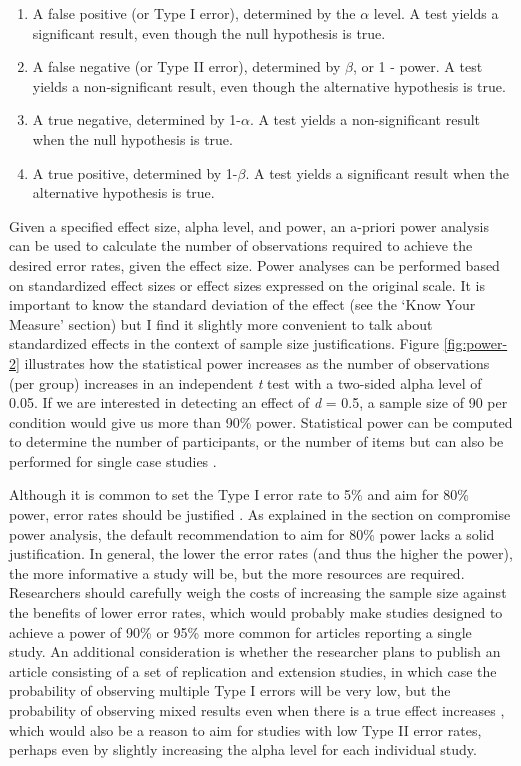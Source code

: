\documentclass[
  oneside]{krantz}
\providecommand{\tightlist}{%
  \setlength{\itemsep}{0pt}\setlength{\parskip}{0pt}}
\begin{document}
\begin{enumerate}
\def\labelenumi{\arabic{enumi}.}
\tightlist
\item
  A false positive (or Type I error), determined by the \(\alpha\) level. A test yields a significant result, even though the null hypothesis is true.
\item
  A false negative (or Type II error), determined by \(\beta\), or 1 - power. A test yields a non-significant result, even though the alternative hypothesis is true.
\item
  A true negative, determined by 1-\(\alpha\). A test yields a non-significant result when the null hypothesis is true.
\item
  A true positive, determined by 1-\(\beta\). A test yields a significant result when the alternative hypothesis is true.
\end{enumerate}

Given a specified effect size, alpha level, and power, an a-priori power analysis can be used to calculate the number of observations required to achieve the desired error rates, given the effect size. Power analyses can be performed based on standardized effect sizes or effect sizes expressed on the original scale. It is important to know the standard deviation of the effect (see the `Know Your Measure' section) but I find it slightly more convenient to talk about standardized effects in the context of sample size justifications. Figure \ref{fig:power-2} illustrates how the statistical power increases as the number of observations (per group) increases in an independent \emph{t} test with a two-sided alpha level of 0.05. If we are interested in detecting an effect of \emph{d} = 0.5, a sample size of 90 per condition would give us more than 90\% power. Statistical power can be computed to determine the number of participants, or the number of items \citep{westfall_statistical_2014} but can also be performed for single case studies \citep{ferron_power_1996, mcintosh_power_2020}.

Although it is common to set the Type I error rate to 5\% and aim for 80\% power, error rates should be justified \citep{lakens_justify_2018}. As explained in the section on compromise power analysis, the default recommendation to aim for 80\% power lacks a solid justification. In general, the lower the error rates (and thus the higher the power), the more informative a study will be, but the more resources are required. Researchers should carefully weigh the costs of increasing the sample size against the benefits of lower error rates, which would probably make studies designed to achieve a power of 90\% or 95\% more common for articles reporting a single study. An additional consideration is whether the researcher plans to publish an article consisting of a set of replication and extension studies, in which case the probability of observing multiple Type I errors will be very low, but the probability of observing mixed results even when there is a true effect increases \citep{lakens_too_2017}, which would also be a reason to aim for studies with low Type II error rates, perhaps even by slightly increasing the alpha level for each individual study.
\end{document}

